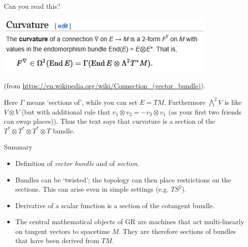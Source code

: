 \documentclass{beamer}
\begin{document}
\begin{frame}{Can you read this?}

\includegraphics[width=11cm]{curvature_definition.png}

(from \url{https://en.wikipedia.org/wiki/Connection_(vector_bundle)}).

Here $\Gamma$ means `sections of', while you can set $E=TM$. Furthermore $\bigwedge^2 V$ is like $V \otimes V$ (but with additional rule that $v_1 \otimes v_2 = -v_2 \otimes v_1$ (as your first two friends can swap places)). Thus the text says that curvature is a section of the $T^* \otimes T^* \otimes T^* \otimes T$ bundle.

\end{frame}

\begin{frame}{Summary}

\begin{itemize}
\item{Definition of \textit{vector bundle} and of \textit{section}.}
\item{Bundles can be `twisted'; the topology can then place restrictions on the sections. This can arise even in simple settings (e.g. $TS^2$).}
\item{Derivative of a scalar function is a section of the cotangent bundle.}
\item{The central mathematical objects of GR are machines that act multi-linearly on tangent vectors to spacetime $M$. They are therefore sections of bundles that have been derived from $TM$.}
\end{itemize}

\end{frame}
\end{document}
